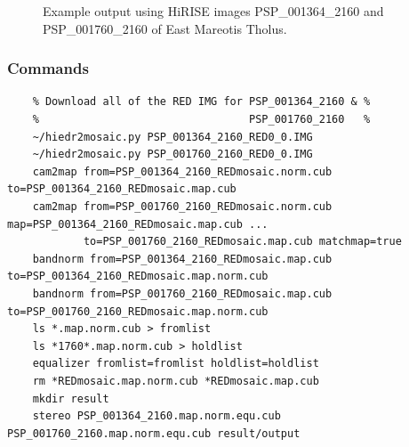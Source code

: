 \begin{figure}[h!]
\centering
  \hfil
\caption{Example output using HiRISE images PSP\_001364\_2160 and
  PSP\_001760\_2160 of East Mareotis Tholus.}
\label{fig:hirise_emare_example}
\end{figure}

\subsubsection*{Commands}

\begin{verbatim}
    % Download all of the RED IMG for PSP_001364_2160 & %
    %                                 PSP_001760_2160   %
    ~/hiedr2mosaic.py PSP_001364_2160_RED0_0.IMG
    ~/hiedr2mosaic.py PSP_001760_2160_RED0_0.IMG
    cam2map from=PSP_001364_2160_REDmosaic.norm.cub to=PSP_001364_2160_REDmosaic.map.cub
    cam2map from=PSP_001760_2160_REDmosaic.norm.cub map=PSP_001364_2160_REDmosaic.map.cub ...
            to=PSP_001760_2160_REDmosaic.map.cub matchmap=true
    bandnorm from=PSP_001364_2160_REDmosaic.map.cub to=PSP_001364_2160_REDmosaic.map.norm.cub
    bandnorm from=PSP_001760_2160_REDmosaic.map.cub to=PSP_001760_2160_REDmosaic.map.norm.cub
    ls *.map.norm.cub > fromlist
    ls *1760*.map.norm.cub > holdlist
    equalizer fromlist=fromlist holdlist=holdlist
    rm *REDmosaic.map.norm.cub *REDmosaic.map.cub
    mkdir result
    stereo PSP_001364_2160.map.norm.equ.cub PSP_001760_2160.map.norm.equ.cub result/output
\end{verbatim}

